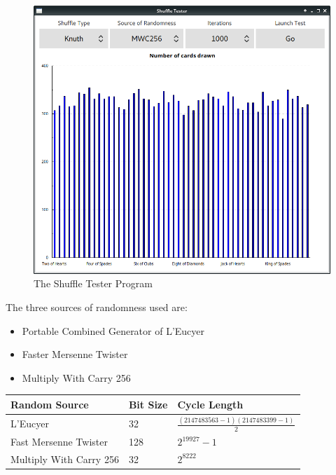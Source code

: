 \begin{figure}[H]
    \centering
    \includegraphics[width=0.8\linewidth]{../images/shuffletester.png}
    \caption{The Shuffle Tester Program}%
    \label{fig:shuffletester}
\end{figure}

The three sources of randomness used are:

\begin{itemize}
    \item Portable Combined Generator of L'Eucyer \parencite{leucyer1988}
    \item Faster Mersenne Twister \parencite{matsumoto1998,saito2008}
    \item Multiply With Carry 256 \parencite{marsaglia2003}
\end{itemize}

\begin{center}
    \begin{tabular}{l l l}
    \toprule
    Random Source           & Bit Size  & Cycle Length  \\
    \midrule
    L'Eucyer                & 32        & $ \displaystyle \frac{(2147483563-1)(2147483399-1)}{2}$   \\ \addlinespace
    Fast Mersenne Twister   & 128       & $ \displaystyle {2}^{19927}-1$                            \\ \addlinespace
    Multiply With Carry 256  & 32        & $ \displaystyle {2}^{8222}$                               \\
    \bottomrule
    \end{tabular}
\end{center}

